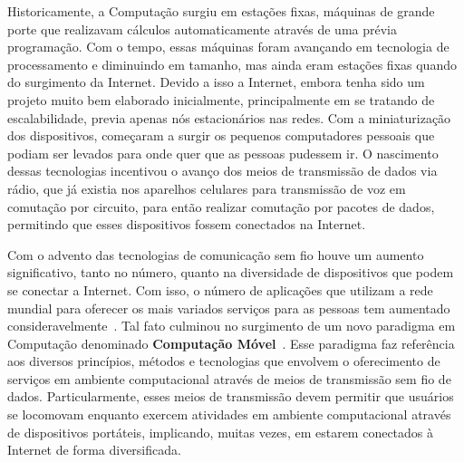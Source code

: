 \documentclass[	12pt, Times, openright, twoside, a4paper, english, brazil]{abntex2}
\begin{document}
Historicamente, a Computação surgiu em estações fixas,  máquinas de grande porte que realizavam cálculos automaticamente através de uma prévia programação. Com o tempo, essas máquinas foram avançando em tecnologia de processamento e diminuindo em tamanho, mas ainda eram estações fixas quando do surgimento da Internet. Devido a isso a Internet, embora tenha sido um projeto muito bem elaborado inicialmente, principalmente em se tratando de escalabilidade, previa apenas nós estacionários nas redes. Com a miniaturização dos dispositivos, começaram a surgir os pequenos computadores pessoais que podiam ser levados para onde quer que as pessoas pudessem ir. O nascimento dessas tecnologias incentivou o avanço dos meios de transmissão de dados via rádio, que já existia nos aparelhos celulares para transmissão de voz em comutação por circuito, para então realizar comutação por pacotes de dados, permitindo que esses dispositivos fossem conectados na Internet.


Com o advento das tecnologias de comunicação sem fio houve um aumento significativo, tanto no número, quanto na diversidade de dispositivos que podem se conectar a Internet. Com isso, o número de aplicações que utilizam a rede mundial para oferecer os mais variados serviços para as pessoas tem aumentado consideravelmente~\cite{CISCO2017}. Tal fato culminou no surgimento de um novo paradigma em Computação denominado \textbf{Computação Móvel}~\cite{mobilecomputing}. Esse paradigma faz referência aos diversos princípios, métodos e tecnologias que envolvem o oferecimento de serviços em ambiente computacional através de meios de transmissão sem fio de dados. Particularmente, esses meios de transmissão devem permitir que usuários se locomovam enquanto exercem atividades em ambiente computacional através de dispositivos portáteis, implicando, muitas vezes, em estarem conectados à Internet de forma diversificada.
\end{document}
